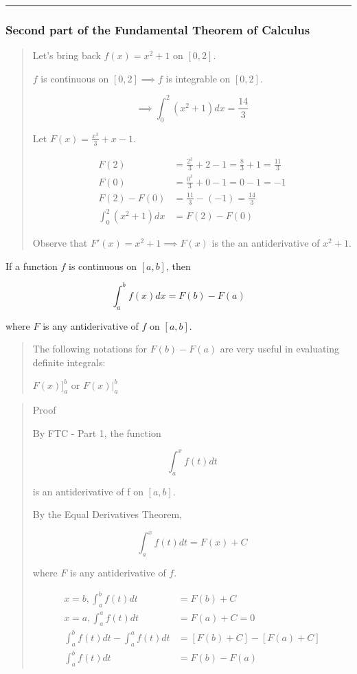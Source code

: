 \documentclass[
]{article}
\begin{document}
\begin{center}\rule{0.5\linewidth}{0.5pt}\end{center}

\hypertarget{second-part-of-the-fundamental-theorem-of-calculus}{%
\subsubsection{Second part of the Fundamental Theorem of
Calculus}\label{second-part-of-the-fundamental-theorem-of-calculus}}

\begin{quote}
Let's bring back \(f(x)=x^2+1\) on \([0,2]\).

\(f\) is continuous on \([0,2] \implies f\) is integrable on \([0,2]\).

\[ \implies \int_0^2 (x^2+1)dx = \frac{14}{3} \]

Let \(\displaystyle F(x)= \frac{x^3}{3}+ x-1\).

\begin{align*}
F(2) &= \frac{2^3}{3}+2-1 = \frac{8}{3}+1 = \frac{11}{3}\\
F(0) &= \frac{0^3}{3}+0-1 = 0-1 = - 1\\
F(2) - F(0) &= \frac{11}{3} -(-1) = \frac{14}{3} \\
\int_0^2 (x^2+1)dx &= F(2)-F(0)
\end{align*}

Observe that \(F'(x) = x^2 +1 \implies F(x)\) is the an antiderivative
of \(x^2+1\).
\end{quote}

If a function \(f\) is continuous on \([a,b]\), then

\[ \int_a^b f(x)dx = F(b)-F(a) \]

where \(F\) is any antiderivative of \(f\) on \([a,b]\).

\begin{quote}
The following notations for \(F(b)-F(a)\) are very useful in evaluating
definite integrals:

\(\displaystyle F(x)\Big]_a^b\) or \(\displaystyle F(x)\Big|_a^b\)
\end{quote}

\begin{quote}
Proof

By FTC - Part 1, the function

\[ \int_a^x f(t)dt \]

is an antiderivative of f on \([a,b]\).

By the Equal Derivatives Theorem,

\[ \int_a^x f(t)dt = F(x) + C \]

where \(F\) is any antiderivative of \(f\).

\begin{align*}
 x= b, \int_a^b f(t)dt &= F(b) + C \\
 x=a , \int_a^a f(t)dt &= F(a) + C = 0 \\
\int_a^b f(t)dt - \int_a^a f(t)dt &= [ F(b)+C ] - [F(a)+C] \\
\int_a^b f(t)dt &= F(b)-F(a)
\end{align*}
\end{quote}
\end{document}
